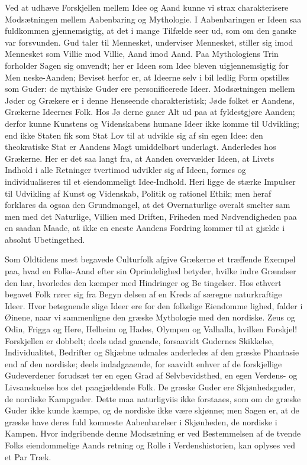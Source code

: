 \documentclass[12pt]{book}
\newcommand{\opage}[1]{\marginnote{\footnotesize\textit{[#1]}}}
\begin{document}
Ved at udhæve Forskjellen mellem Idee og Aand
kunne vi strax charakterisere Modsætningen mellem
Aabenbaring og Mythologie. I Aabenbaringen er Ideen
saa fuldkommen gjennemsigtig, at det i mange Tilfælde
seer ud, som om den ganske var forsvunden. Gud taler
til Mennesket, underviser Mennesket, stiller sig imod
Mennesket som Villie mod Villie, Aand imod Aand.
Paa Mythologiens Trin forholder Sagen sig omvendt;
her er Ideen som Idee bleven uigjennemsigtig for Men\-%
neske-Aanden; Beviset herfor er, at Ideerne selv i bil\-%
ledlig Form opstilles som Guder: de mythiske Guder
\opage{21}\setcounter{footnote}{0}%
ere personificerede Ideer. Modsætningen mellem Jøder
og Grækere er i denne Henseende charakteristisk; Jøde\-%
folket er Aandens, Grækerne Ideernes Folk. Hos Jø\-%
derne gaaer Alt ud paa at fyldestgjøre Aanden; derfor
kunne Kunstens og Videnskabens humane Ideer ikke
komme til Udvikling; end ikke Staten fik som Stat Lov
til at udvikle sig af sin egen Idee: den theokratiske Stat
er Aandens Magt umiddelbart underlagt. Anderledes
hos Grækerne. Her er det saa langt fra, at Aanden
overvælder Ideen, at Livets Indhold i alle Retninger
tvertimod udvikler sig af Ideen, formes og individualiseres
til et eiendommeligt Idee-Indhold. Heri ligge de stærke
Impulser til Udvikling af Kunst og Videnskab, Politik
og rationel Ethik; men heraf forklares da ogsaa den
Grundmangel, at det Overnaturlige overalt smelter sam\-%
men med det Naturlige, Villien med Driften, Friheden
med Nødvendigheden paa en saadan Maade, at ikke en
eneste Aandens Fordring kommer til at gjælde i absolut
Ubetingethed.

Som Oldtidens mest begavede Culturfolk afgive
Grækerne et træffende Exempel paa, hvad en Folke-Aand
efter sin Oprindelighed betyder, hvilke indre Grændser
den har, hvorledes den kæmper med Hindringer og Be\-%
tingelser. Hos ethvert begavet Folk rører sig fra Begyn\-%
delsen af en Kreds af særegne naturkraftige Ideer. Hvor
betegnende slige Ideer ere for den folkelige Eiendomme\-%
lighed, falder i Øinene, naar vi sammenligne den græske
Mythologie med den nordiske. Zeus og Odin, Frigga
og Here, Helheim og Hades, Olympen og Valhalla,
hvilken Forskjel! Forskjellen er dobbelt; deels udad\-%
gaaende, forsaavidt Gudernes Skikkelse, Individualitet,
Bedrifter og Skjæbne udmales anderledes af den græske
Phantasie end af den nordiske; deels indadgaaende, for\-%
saavidt enhver af de forskjellige Gudeverdener forudsæt\-%
\opage{22}\setcounter{footnote}{0}%
ter en egen Grad af Selvbevidsthed, en egen Verdens- og
Livsanskuelse hos det paagjældende Folk. De græske
Guder ere Skjønhedsguder, de nordiske Kampguder.
Dette maa naturligviis ikke forstaaes, som om de græske
Guder ikke kunde kæmpe, og de nordiske ikke være
skjønne; men Sagen er, at de græske have deres fuld\-%
komneste Aabenbarelser i Skjønheden, de nordiske i
Kampen. Hvor indgribende denne Modsætning er ved
Bestemmelsen af de tvende Folks eiendommelige Aands\-%
retning og Rolle i Verdenshistorien, kan oplyses ved
et Par Træk.
\end{document}
